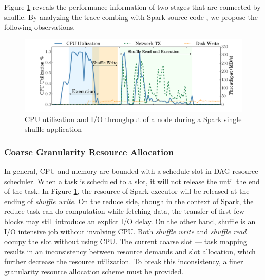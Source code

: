 Figure \ref{fig:util} reveals the performance information of two stages that are connected by shuffle. By analyzing the trace combing with Spark source code \cite{sparksource}, we propose the following observations. 

\begin{figure}
	\includegraphics[width=\linewidth]{fig/util}
	\caption{CPU utilization and I/O throughput of a node during a Spark single shuffle application}
	\label{fig:util}
\end{figure}

\subsubsection{Coarse Granularity Resource Allocation}
In general, CPU and memory are bounded with a schedule slot in DAG resource scheduler. When a task is scheduled to a slot, it will not release the until the end of the task. In Figure \ref{fig:util}, the resource of Spark executor will be released at the ending of \textit{shuffle write}. On the reduce side, though in the context of Spark, the reduce task can do computation while fetching data, the transfer of first few blocks may still introduce an explict I/O delay. On the other hand, shuffle is an I/O intensive job without involving CPU. Both \textit{shuffle write} and \textit{shuffle read} occupy the slot without using CPU. The current coarse slot --- task mapping results in an inconsistency between resource demands and slot allocation, which further decrease the resource utilization. To break this inconsistency, a finer granularity resource allocation scheme must be provided.

